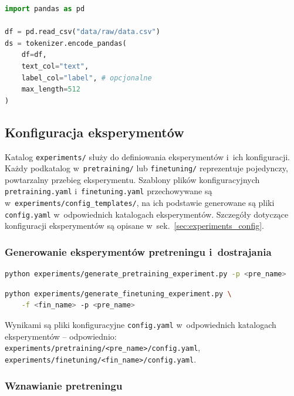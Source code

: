 \documentclass[a4paper,11pt,twoside]{report}
\theoremstyle{definition}
\begin{document}
\begin{lstlisting}[language=python, caption={Tokenizacja z ramki danych Pandas}]
import pandas as pd

df = pd.read_csv("data/raw/data.csv")
ds = tokenizer.encode_pandas(
    df=df,
    text_col="text",
    label_col="label", # opcjonalne
    max_length=512
)
\end{lstlisting}

\subsection{Konfiguracja eksperymentów}
\label{sec:experiments_config_guide}

Katalog \texttt{experiments/} służy do definiowania eksperymentów i~ich konfiguracji. Każdy podkatalog w~\texttt{pretraining/} lub \texttt{finetuning/} reprezentuje pojedynczy, powtarzalny przebieg eksperymentu. Szablony plików konfiguracyjnych \texttt{pretraining.yaml} i~\texttt{finetuning.yaml} przechowywane są w~\texttt{experiments/config\_templates/}, na ich podstawie generowane są pliki \texttt{config.yaml} w~odpowiednich katalogach eksperymentów. Szczegóły dotyczące konfiguracji eksperymentów są opisane w~sek.~\ref{sec:experiments_config}.

\subsubsection{Generowanie eksperymentów pretreningu i~dostrajania}

\begin{lstlisting}[language=bash, caption={Generowanie eksperymentu pretreningu}]
python experiments/generate_pretraining_experiment.py -p <pre_name>
\end{lstlisting}

\begin{lstlisting}[language=bash, caption={Generowanie eksperymentu dostrajania}]
python experiments/generate_finetuning_experiment.py \
    -f <fin_name> -p <pre_name>
\end{lstlisting}
Wynikami są pliki konfiguracyjne \texttt{config.yaml} w~odpowiednich katalogach eksperymentów -- odpowiednio:
\texttt{experiments/pretraining/<pre\_name>/config.yaml}, \texttt{experiments/finetuning/<fin\_name>/config.yaml}.


\subsubsection{Wznawianie pretreningu}\label{sec:checkpointing2}
\end{document}
